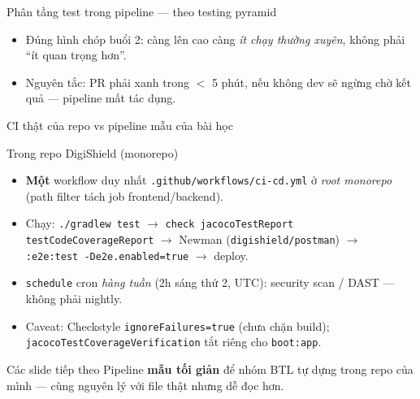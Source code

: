 \documentclass[aspectratio=169,12pt]{beamer}
\begin{document}
\begin{frame}{Phân tầng test trong pipeline --- theo testing pyramid}
  \small
  \begin{table}
    \small
  \end{table}
  \begin{itemize}
    \item Đúng hình chóp buổi 2: càng lên cao càng \emph{ít chạy thường xuyên}, không phải ``ít quan trọng hơn''.
    \item Nguyên tắc: PR phải xanh trong $<$ 5 phút, nếu không dev sẽ ngừng chờ kết quả --- pipeline mất tác dụng.
  \end{itemize}
\end{frame}

\begin{frame}{CI thật của repo vs pipeline mẫu của bài học}
  \begin{block}{Trong repo DigiShield (monorepo)}
    \begin{itemize}\footnotesize
      \item \textbf{Một} workflow duy nhất
        \texttt{.github/workflows/ci-cd.yml} ở \emph{root monorepo}
        (path filter tách job frontend/backend).
      \item Chạy: \texttt{./gradlew test} $\to$ \texttt{check
        jacocoTestReport testCodeCoverageReport} $\to$ Newman
        (\texttt{digishield/postman}) $\to$
        \texttt{:e2e:test -De2e.enabled=true} $\to$ deploy.
      \item \texttt{schedule} cron \emph{hàng tuần} (2h sáng thứ 2, UTC):
        security scan / DAST --- không phải nightly.
      \item Caveat: Checkstyle \texttt{ignoreFailures=true} (chưa chặn
        build); \texttt{jacocoTestCoverageVerification} tắt riêng cho
        \texttt{boot:app}.
    \end{itemize}
  \end{block}

  \begin{exampleblock}{Các slide tiếp theo}
    \footnotesize Pipeline \textbf{mẫu tối giản} để nhóm BTL tự dựng trong
    repo của mình --- cùng nguyên lý với file thật nhưng dễ đọc hơn.
  \end{exampleblock}
\end{frame}
\end{document}
